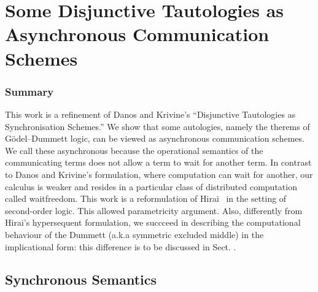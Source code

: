 \chapter{Some Disjunctive Tautologies as
  Asynchronous Communication Schemes}




% 


\subsection{Summary}
This work is a refinement of
Danos and Krivine's ``Disjunctive Tautologies as
Synchronisation Schemes.''
We show that some autologies,
namely the therems of G\"odel--Dummett logic,
can be viewed as asynchronous communication schemes.
We call these asynchronous because the operational semantics
of the communicating terms does not allow a term to wait for another
term.
In contrast to Danos and Krivine's  formulation,
where computation can wait for another,
our calculus is weaker and resides in a particular class of
distributed computation called waitfreedom.
This work is a reformulation of Hirai~ in the setting of
second-order logic.
This allowed parametricity argument.
Also, differently from Hirai's  hypersequent formulation,
we succceed in describing the computational behaviour of the Dummett
(a.k.a symmetric excluded middle) in the implicational form: this
difference is to be discussed in Sect. .




\section{Synchronous Semantics}

